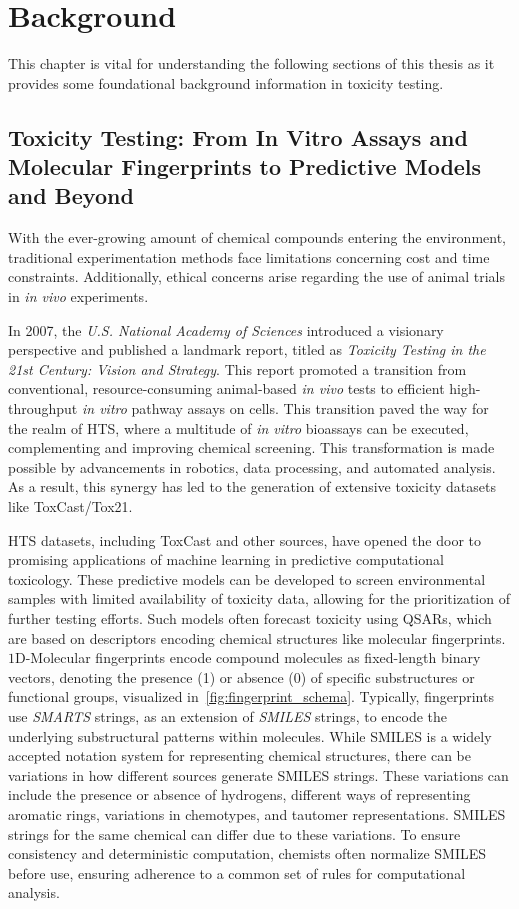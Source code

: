 \chapter{Background}\label{chap:background}
This chapter is vital for understanding the following sections of this thesis as it provides some foundational background information in toxicity testing.

\section{Toxicity Testing: From In Vitro Assays and Molecular Fingerprints to Predictive Models and Beyond}\label{sec:toxicity_testing}

With the ever-growing amount of chemical compounds entering the environment, traditional experimentation methods face limitations concerning cost and time constraints. Additionally, ethical concerns arise regarding the use of animal trials in \emph{in vivo} experiments.

In 2007, the \emph{U.S. National Academy of Sciences} introduced a visionary perspective and published a landmark report, titled as \emph{Toxicity Testing in the 21st Century: Vision and Strategy}. This report promoted a transition from conventional, resource-consuming animal-based \emph{in vivo} tests to efficient high-throughput \emph{in vitro} pathway assays on cells. This transition paved the way for the realm of HTS, where a multitude of \emph{in vitro} bioassays can be executed, complementing and improving chemical screening. This transformation is made possible by advancements in robotics, data processing, and automated analysis. As a result, this synergy has led to the generation of extensive toxicity datasets like ToxCast/Tox21.
 
HTS datasets, including ToxCast and other sources, have opened the door to promising applications of machine learning in predictive computational toxicology. These predictive models can be developed to screen environmental samples with limited availability of toxicity data, allowing for the prioritization of further testing efforts. Such models often forecast toxicity using QSARs, which are based on descriptors encoding chemical structures like molecular fingerprints. $1$D-Molecular fingerprints encode compound molecules as fixed-length binary vectors, denoting the presence (1) or absence (0) of specific substructures or functional groups, visualized in~\ref{fig:fingerprint_schema}. Typically, fingerprints use \emph{SMARTS} strings, as an extension of \emph{SMILES} strings, to encode the underlying substructural patterns within molecules. While SMILES is a widely accepted notation system for representing chemical structures, there can be variations in how different sources generate SMILES strings. These variations can include the presence or absence of hydrogens, different ways of representing aromatic rings, variations in chemotypes, and tautomer representations. SMILES strings for the same chemical can differ due to these variations. To ensure consistency and deterministic computation, chemists often normalize SMILES before use, ensuring adherence to a common set of rules for computational analysis.

